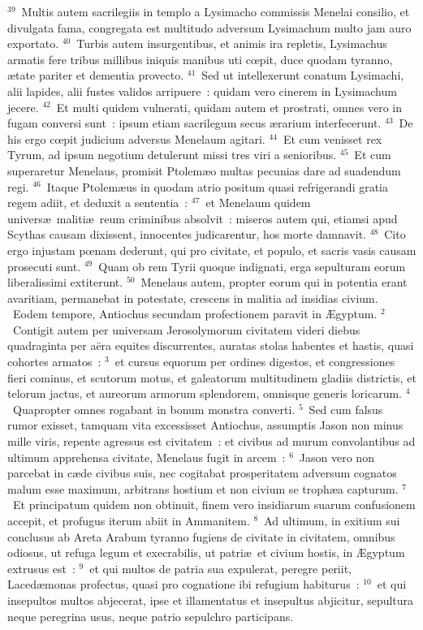 ${}^{39}$~Multis autem sacrilegiis in templo a Lysimacho commissis Menelai consilio, et divulgata fama, congregata est multitudo adversum Lysimachum multo jam auro exportato.
${}^{40}$~Turbis autem insurgentibus, et animis ira repletis, Lysimachus armatis fere tribus millibus iniquis manibus uti cœpit, duce quodam tyranno, \ae tate pariter et dementia provecto.
${}^{41}$~Sed ut intellexerunt conatum Lysimachi, alii lapides, alii fustes validos arripuere~: quidam vero cinerem in Lysimachum jecere.
${}^{42}$~Et multi quidem vulnerati, quidam autem et prostrati, omnes vero in fugam conversi sunt~: ipsum etiam sacrilegum secus \ae rarium interfecerunt.
${}^{43}$~De his ergo cœpit judicium adversus Menelaum agitari.
${}^{44}$~Et cum venisset rex Tyrum, ad ipsum negotium detulerunt missi tres viri a senioribus.
${}^{45}$~Et cum superaretur Menelaus, promisit Ptolem\ae o multas pecunias dare ad suadendum regi.
${}^{46}$~Itaque Ptolem\ae us in quodam atrio positum quasi refrigerandi gratia regem adiit, et deduxit a sententia~:
${}^{47}$~et Menelaum quidem univers\ae\ maliti\ae\ reum criminibus absolvit~: miseros autem qui, etiamsi apud Scythas causam dixissent, innocentes judicarentur, hos morte damnavit.
${}^{48}$~Cito ergo injustam pœnam dederunt, qui pro civitate, et populo, et sacris vasis causam prosecuti sunt.
${}^{49}$~Quam ob rem Tyrii quoque indignati, erga sepulturam eorum liberalissimi extiterunt.
${}^{50}$~Menelaus autem, propter eorum qui in potentia erant avaritiam, permanebat in potestate, crescens in malitia ad insidias civium.
~Eodem tempore, Antiochus secundam profectionem paravit in \AE gyptum.
${}^{2}$~Contigit autem per universam Jerosolymorum civitatem videri diebus quadraginta per a\"era equites discurrentes, auratas stolas habentes et hastis, quasi cohortes armatos~:
${}^{3}$~et cursus equorum per ordines digestos, et congressiones fieri cominus, et scutorum motus, et galeatorum multitudinem gladiis districtis, et telorum jactus, et aureorum armorum splendorem, omnisque generis loricarum.
${}^{4}$~Quapropter omnes rogabant in bonum monstra converti.
${}^{5}$~Sed cum falsus rumor exisset, tamquam vita excessisset Antiochus, assumptis Jason non minus mille viris, repente agressus est civitatem~: et civibus ad murum convolantibus ad ultimum apprehensa civitate, Menelaus fugit in arcem~:
${}^{6}$~Jason vero non parcebat in c\ae de civibus suis, nec cogitabat prosperitatem adversum cognatos malum esse maximum, arbitrans hostium et non civium se troph\ae a capturum.
${}^{7}$~Et principatum quidem non obtinuit, finem vero insidiarum suarum confusionem accepit, et profugus iterum abiit in Ammanitem.
${}^{8}$~Ad ultimum, in exitium sui conclusus ab Areta Arabum tyranno fugiens de civitate in civitatem, omnibus odiosus, ut refuga legum et execrabilis, ut patri\ae\ et civium hostis, in \AE gyptum extrusus est~:
${}^{9}$~et qui multos de patria sua expulerat, peregre periit, Laced\ae monas profectus, quasi pro cognatione ibi refugium habiturus~:
${}^{10}$~et qui insepultos multos abjecerat, ipse et illamentatus et insepultus abjicitur, sepultura neque peregrina usus, neque patrio sepulchro participans.


